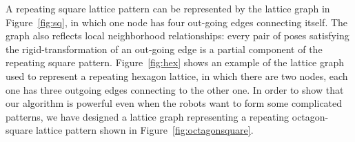 A repeating square lattice pattern can be represented by the lattice graph in Figure~\ref{fig:sq}, 
in which one node has four out-going edges connecting itself. 
%
The graph also reflects local neighborhood relationships:
%
every pair of poses satisfying the rigid-transformation of an out-going edge is a partial component of the repeating square pattern.
%
Figure~\ref{fig:hex} shows an example of the lattice graph used to represent a
repeating hexagon lattice, in which there are two nodes, each one has three outgoing edges connecting to the other one. 
%
In order to show that our algorithm is powerful even when the robots want to form some complicated patterns, 
we have designed a lattice graph representing a repeating octagon-square lattice pattern shown in Figure~\ref{fig:octagonsquare}.
%

\begin{figure}
  \centering
  
  \label{fig:edgetrans}
\end{figure}

